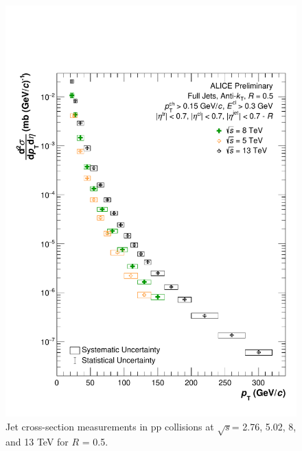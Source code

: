 \documentclass[ALICE]{ALICE_analysis_notes}
\newcommand{\s}{$\sqrt{s}$\xspace}
\newcommand{\pp}{pp\xspace}
\begin{document}
\begin{appendix}
\begin{figure}[h!]
    \centering
    \includegraphics[width=15cm]{figures/EnergyComparisons/SpectrumComparison_R05.pdf}
    \caption{Jet cross-section measurements in \pp collisions at \s = 2.76, 5.02, 8, and 13 TeV for $R$ = 0.5.}
    \label{fig:appSpecCompareR05}
\end{figure}
\iffalse
\begin{figure}[]
    \centering

\end{figure}
\end{appendix}
\end{document}
